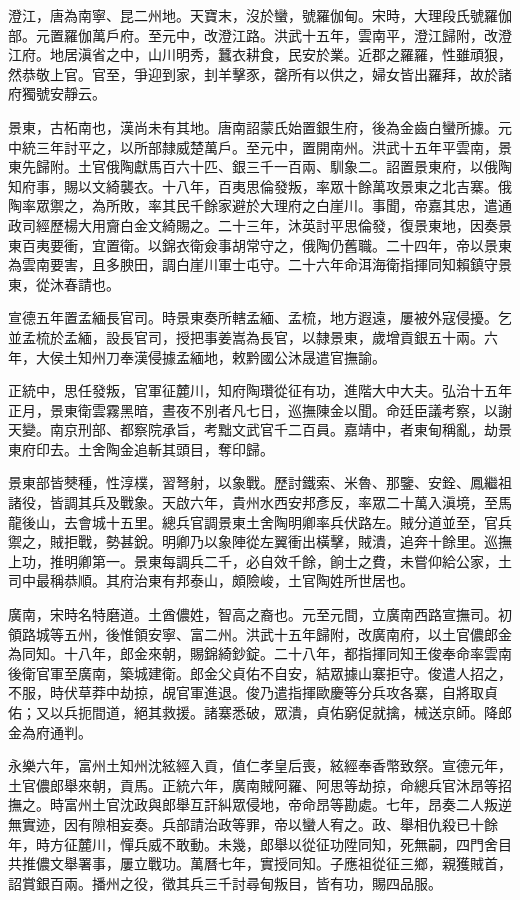 \begin{pinyinscope}
澄江，唐為南寧、昆二州地。天寶末，沒於蠻，號羅伽甸。宋時，大理段氏號羅伽部。元置羅伽萬戶府。至元中，改澄江路。洪武十五年，雲南平，澄江歸附，改澄江府。地居滇省之中，山川明秀，蠶衣耕食，民安於業。近郡之羅羅，性雖頑狠，然恭敬上官。官至，爭迎到家，刲羊擊豕，罄所有以供之，婦女皆出羅拜，故於諸府獨號安靜云。

景東，古柘南也，漢尚未有其地。唐南詔蒙氏始置銀生府，後為金齒白蠻所據。元中統三年討平之，以所部隸威楚萬戶。至元中，置開南州。洪武十五年平雲南，景東先歸附。土官俄陶獻馬百六十匹、銀三千一百兩、馴象二。詔置景東府，以俄陶知府事，賜以文綺襲衣。十八年，百夷思倫發叛，率眾十餘萬攻景東之北吉寨。俄陶率眾禦之，為所敗，率其民千餘家避於大理府之白崖川。事聞，帝嘉其忠，遣通政司經歷楊大用齎白金文綺賜之。二十三年，沐英討平思倫發，復景東地，因奏景東百夷要衝，宜置衛。以錦衣衛僉事胡常守之，俄陶仍舊職。二十四年，帝以景東為雲南要害，且多腴田，調白崖川軍士屯守。二十六年命洱海衛指揮同知賴鎮守景東，從沐春請也。

宣德五年置孟緬長官司。時景東奏所轄孟緬、孟梳，地方遐遠，屢被外寇侵擾。乞並孟梳於孟緬，設長官司，授把事姜嵩為長官，以隸景東，歲增貢銀五十兩。六年，大侯土知州刀奉漢侵據孟緬地，敕黔國公沐晟遣官撫諭。

正統中，思任發叛，官軍征麓川，知府陶瓚從征有功，進階大中大夫。弘治十五年正月，景東衛雲霧黑暗，晝夜不別者凡七日，巡撫陳金以聞。命廷臣議考察，以謝天變。南京刑部、都察院承旨，考黜文武官千二百員。嘉靖中，者東甸稱亂，劫景東府印去。土舍陶金追斬其頭目，奪印歸。

景東部皆僰種，性淳樸，習弩射，以象戰。歷討鐵索、米魯、那鑒、安銓、鳳繼祖諸役，皆調其兵及戰象。天啟六年，貴州水西安邦彥反，率眾二十萬入滇境，至馬龍後山，去會城十五里。總兵官調景東土舍陶明卿率兵伏路左。賊分道並至，官兵禦之，賊拒戰，勢甚銳。明卿乃以象陣從左翼衝出橫擊，賊潰，追奔十餘里。巡撫上功，推明卿第一。景東每調兵二千，必自效千餘，餉士之費，未嘗仰給公家，土司中最稱恭順。其府治東有邦泰山，頗險峻，土官陶姓所世居也。

廣南，宋時名特磨道。土酋儂姓，智高之裔也。元至元間，立廣南西路宣撫司。初領路城等五州，後惟領安寧、富二州。洪武十五年歸附，改廣南府，以土官儂郎金為同知。十八年，郎金來朝，賜錦綺鈔錠。二十八年，都指揮同知王俊奉命率雲南後衛官軍至廣南，築城建衛。郎金父貞佑不自安，結眾據山寨拒守。俊遣人招之，不服，時伏草莽中劫掠，覘官軍進退。俊乃遣指揮歐慶等分兵攻各寨，自將取貞佑；又以兵扼間道，絕其救援。諸寨悉破，眾潰，貞佑窮促就擒，械送京師。降郎金為府通判。

永樂六年，富州土知州沈絃經入貢，值仁孝皇后喪，絃經奉香幣致祭。宣德元年，土官儂郎舉來朝，貢馬。正統六年，廣南賊阿羅、阿思等劫掠，命總兵官沐昂等招撫之。時富州土官沈政與郎舉互訐糾眾侵地，帝命昂等勘處。七年，昂奏二人叛逆無實迹，因有隙相妄奏。兵部請治政等罪，帝以蠻人宥之。政、舉相仇殺已十餘年，時方征麓川，憚兵威不敢動。未幾，郎舉以從征功陞同知，死無嗣，四門舍目共推儂文舉署事，屢立戰功。萬曆七年，實授同知。子應祖從征三鄉，親獲賊首，詔賞銀百兩。播州之役，徵其兵三千討尋甸叛目，皆有功，賜四品服。


\end{pinyinscope}

